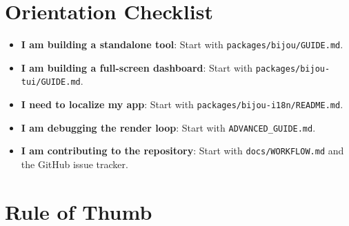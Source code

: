 \section{Orientation Checklist}\label{record-008-orientation-checklist}

\begin{itemize}
\tightlist
\item[$\square$]
  \textbf{I am building a standalone tool}: Start with \texttt{p\allowbreak{}a\allowbreak{}c\allowbreak{}k\allowbreak{}a\allowbreak{}g\allowbreak{}e\allowbreak{}s\allowbreak{}/\allowbreak{}b\allowbreak{}i\allowbreak{}j\allowbreak{}o\allowbreak{}u\allowbreak{}/\allowbreak{}G\allowbreak{}U\allowbreak{}I\allowbreak{}D\allowbreak{}E\allowbreak{}.\allowbreak{}m\allowbreak{}d}.
\item[$\square$]
  \textbf{I am building a full-screen dashboard}: Start with \texttt{p\allowbreak{}a\allowbreak{}c\allowbreak{}k\allowbreak{}a\allowbreak{}g\allowbreak{}e\allowbreak{}s\allowbreak{}/\allowbreak{}b\allowbreak{}i\allowbreak{}j\allowbreak{}o\allowbreak{}u\allowbreak{}-\allowbreak{}t\allowbreak{}u\allowbreak{}i\allowbreak{}/\allowbreak{}G\allowbreak{}U\allowbreak{}I\allowbreak{}D\allowbreak{}E\allowbreak{}.\allowbreak{}m\allowbreak{}d}.
\item[$\square$]
  \textbf{I need to localize my app}: Start with \texttt{p\allowbreak{}a\allowbreak{}c\allowbreak{}k\allowbreak{}a\allowbreak{}g\allowbreak{}e\allowbreak{}s\allowbreak{}/\allowbreak{}b\allowbreak{}i\allowbreak{}j\allowbreak{}o\allowbreak{}u\allowbreak{}-\allowbreak{}i\allowbreak{}1\allowbreak{}8\allowbreak{}n\allowbreak{}/\allowbreak{}R\allowbreak{}E\allowbreak{}A\allowbreak{}D\allowbreak{}M\allowbreak{}E\allowbreak{}.\allowbreak{}m\allowbreak{}d}.
\item[$\square$]
  \textbf{I am debugging the render loop}: Start with \texttt{A\allowbreak{}D\allowbreak{}V\allowbreak{}A\allowbreak{}N\allowbreak{}C\allowbreak{}E\allowbreak{}D\allowbreak{}\_\allowbreak{}G\allowbreak{}U\allowbreak{}I\allowbreak{}D\allowbreak{}E\allowbreak{}.\allowbreak{}m\allowbreak{}d}.
\item[$\square$]
  \textbf{I am contributing to the repository}: Start with \texttt{d\allowbreak{}o\allowbreak{}c\allowbreak{}s\allowbreak{}/\allowbreak{}W\allowbreak{}O\allowbreak{}R\allowbreak{}K\allowbreak{}F\allowbreak{}L\allowbreak{}O\allowbreak{}W\allowbreak{}.\allowbreak{}m\allowbreak{}d} and the GitHub issue tracker.
\end{itemize}

\section{Rule of Thumb}\label{record-008-rule-of-thumb}

